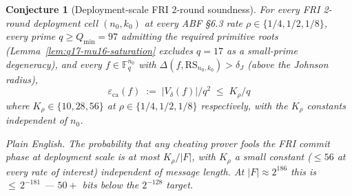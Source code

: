 \documentclass[11pt]{article}
\newtheorem{conjecture}[theorem]{Conjecture}
\theoremstyle{definition}
\theoremstyle{remark}
\newcommand{\FF}{\mathbb{F}}
\newcommand{\RS}{\mathrm{RS}}
\begin{document}
\begin{conjecture}[Deployment-scale FRI 2-round soundness]
\label{conj:deployment-soundness}
For every FRI 2-round deployment cell $(n_0, k_0)$ at every ABF
\S 6.3 rate $\rho \in \{1/4, 1/2, 1/8\}$, every prime
$q \geq Q_{\min} = 97$ admitting the required primitive roots
(Lemma~\ref{lem:q17-mu16-saturation} excludes $q = 17$ as a
small-prime degeneracy), and every $f \in \FF_q^{n_0}$
with $\Delta(f, \RS_{n_0, k_0}) > \delta_J$ (above the Johnson radius),
\[
   \boxed{\;\;
      \varepsilon_{\mathrm{ca}}(f) \;:=\; |V_\delta(f)| / q^2
      \;\leq\; K_\rho / q
   \;\;}
\]
where $K_\rho \in \{10, 28, 56\}$ at $\rho \in \{1/4, 1/2, 1/8\}$
respectively, with the $K_\rho$ constants independent of $n_0$.

\smallskip\noindent
\emph{Plain English.} The probability that any cheating prover fools
the FRI commit phase at deployment scale is at most $K_\rho / |F|$,
with $K_\rho$ a small constant ($\leq 56$ at every rate of interest)
independent of message length. At $|F| \approx 2^{186}$ this is
${\leq}\,2^{-181}$ --- $50{+}$ bits below the $2^{-128}$ target.
\end{conjecture}
\end{document}

